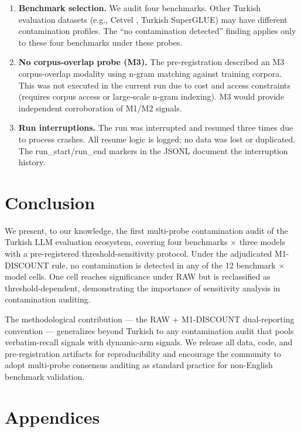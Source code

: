 \documentclass[11pt]{article}
\begin{document}
\begin{enumerate}
\item \textbf{Benchmark selection.} We audit four benchmarks. Other Turkish evaluation datasets (e.g., Cetvel \cite{yildiz2025evaluating}, Turkish SuperGLUE) may have different contamination profiles. The ``no contamination detected'' finding applies only to these four benchmarks under these probes.

\item \textbf{No corpus-overlap probe (M3).} The pre-registration described an M3 corpus-overlap modality using n-gram matching against training corpora. This was not executed in the current run due to cost and access constraints (requires corpus access or large-scale n-gram indexing). M3 would provide independent corroboration of M1/M2 signals.

\item \textbf{Run interruptions.} The run was interrupted and resumed three times due to process crashes. All resume logic is logged; no data was lost or duplicated. The run\_start/run\_end markers in the JSONL document the interruption history.
\end{enumerate}

\section{Conclusion}

We present, to our knowledge, the first multi-probe contamination audit of the Turkish LLM evaluation ecosystem, covering four benchmarks $\times$ three models with a pre-registered threshold-sensitivity protocol. Under the adjudicated M1-DISCOUNT rule, no contamination is detected in any of the 12 benchmark $\times$ model cells. One cell reaches significance under RAW but is reclassified as threshold-dependent, demonstrating the importance of sensitivity analysis in contamination auditing.

The methodological contribution --- the RAW + M1-DISCOUNT dual-reporting convention --- generalizes beyond Turkish to any contamination audit that pools verbatim-recall signals with dynamic-arm signals. We release all data, code, and pre-registration artifacts for reproducibility and encourage the community to adopt multi-probe consensus auditing as standard practice for non-English benchmark validation.

\section*{Appendices}
\end{document}
